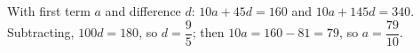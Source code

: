 With first term $a$ and difference $d$: $10a+45d=160$ and $10a+145d=340$. Subtracting, $100d=180$, so $d=\dfrac{9}{5}$; then $10a=160-81=79$, so $a=\boxed{\dfrac{79}{10}}$.
